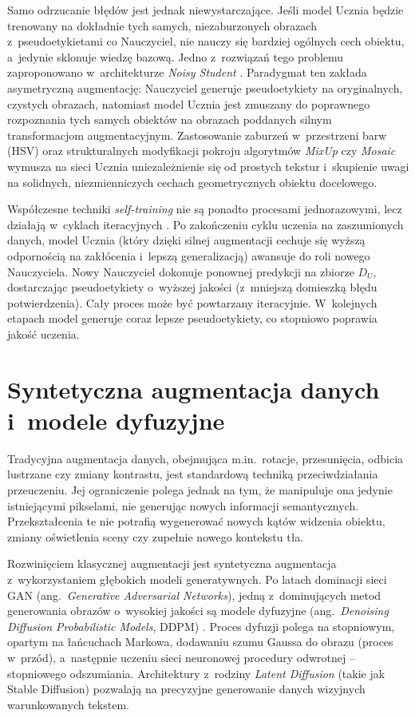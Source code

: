Samo odrzucanie błędów jest jednak niewystarczające. Jeśli model Ucznia będzie trenowany na dokładnie tych samych, niezaburzonych obrazach z~pseudoetykietami co Nauczyciel, nie nauczy się bardziej ogólnych cech obiektu, a~jedynie sklonuje wiedzę bazową. Jedno z~rozwiązań tego problemu zaproponowano w~architekturze \emph{Noisy Student} \cite{Xie2020}. Paradygmat ten zakłada asymetryczną augmentację: Nauczyciel generuje pseudoetykiety na oryginalnych, czystych obrazach, natomiast model Ucznia jest zmuszany do poprawnego rozpoznania tych samych obiektów na obrazach poddanych silnym transformacjom augmentacyjnym. Zastosowanie zaburzeń w~przestrzeni barw (HSV) oraz strukturalnych modyfikacji pokroju algorytmów \emph{MixUp} \cite{Zhang2017} czy \emph{Mosaic} wymusza na sieci Ucznia uniezależnienie się od prostych tekstur i~skupienie uwagi na solidnych, niezmienniczych cechach geometrycznych obiektu docelowego. 

Współczesne techniki \emph{self-training} nie są ponadto procesami jednorazowymi, lecz działają w~cyklach iteracyjnych \cite{Zoph2020}. Po zakończeniu cyklu uczenia na zaszumionych danych, model Ucznia (który dzięki silnej augmentacji cechuje się wyższą odpornością na zakłócenia i~lepszą generalizacją) awansuje do roli nowego Nauczyciela. Nowy Nauczyciel dokonuje ponownej predykcji na zbiorze $D_U$, dostarczając pseudoetykiety o~wyższej jakości (z~mniejszą domieszką błędu potwierdzenia). Cały proces może być powtarzany iteracyjnie. W~kolejnych etapach model generuje coraz lepsze pseudoetykiety, co stopniowo poprawia jakość uczenia.

\section{Syntetyczna augmentacja danych i~modele dyfuzyjne}

Tradycyjna augmentacja danych, obejmująca m.in.\ rotacje, przesunięcia, odbicia lustrzane czy zmiany kontrastu, jest standardową techniką przeciwdziałania przeuczeniu. Jej ograniczenie polega jednak na tym, że manipuluje ona jedynie istniejącymi pikselami, nie generując nowych informacji semantycznych. Przekształcenia te nie potrafią wygenerować nowych kątów widzenia obiektu, zmiany oświetlenia sceny czy zupełnie nowego kontekstu tła.

Rozwinięciem klasycznej augmentacji jest syntetyczna augmentacja z~wykorzystaniem głębokich modeli generatywnych. Po latach dominacji sieci GAN (ang.\ \emph{Generative Adversarial Networks}), jedną z~dominujących metod generowania obrazów o~wysokiej jakości są modele dyfuzyjne (ang.\ \emph{Denoising Diffusion Probabilistic Models}, DDPM) \cite{Ho2020}. Proces dyfuzji polega na stopniowym, opartym na łańcuchach Markowa, dodawaniu szumu Gaussa do obrazu (proces w~przód), a~następnie uczeniu sieci neuronowej procedury odwrotnej -- stopniowego odszumiania. Architektury z~rodziny \emph{Latent Diffusion} (takie jak Stable Diffusion) \cite{Rombach2022} pozwalają na precyzyjne generowanie danych wizyjnych warunkowanych tekstem.

